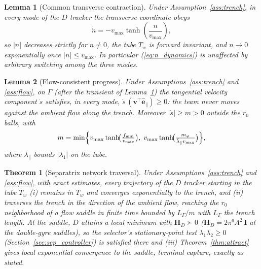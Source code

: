 \documentclass[lettersize,journal]{IEEEtran}
\newtheorem{theorem}{Theorem}
\newtheorem{lemma}{Lemma}
\begin{document}
\begin{lemma}[Common transverse contraction]
\label{lem:transverse}
Under Assumption~\ref{ass:trench}, in every mode of the $D$ tracker
the transverse coordinate obeys
\begin{equation}
    \dot{n} = -v_{\max}\tanh\!\left(\frac{n}{v_{\max}}\right),
    \label{eq:n_dynamics}
\end{equation}
so $|n|$ decreases strictly for $n \neq 0$, the tube $T_w$ is forward
invariant, and $n \to 0$ exponentially once $|n| \leq v_{\max}$. In
particular (\ref{eq:n_dynamics}) is unaffected by arbitrary switching
among the three modes.
\end{lemma}

\begin{lemma}[Flow-consistent progress]
\label{lem:progress}
Under Assumptions~\ref{ass:trench} and \ref{ass:flow}, on $\Gamma$
(after the transient of Lemma~\ref{lem:transverse}) the tangential
velocity component $\dot{s}$ satisfies, in every mode,
$\dot{s}\,(\mathbf{v}^\top \hat{\mathbf{e}}_\parallel) \geq 0$: the team
never moves against the ambient flow along the trench. Moreover
$|\dot{s}| \geq m > 0$ outside the $r_0$ balls, with
\begin{equation}
    m = \min\Bigl\{
    v_{\max}\tanh\!\bigl(\tfrac{f_{\min}}{v_{\max}}\bigr),\;
    v_{\max}\tanh\!\bigl(\tfrac{m_\varphi}
    {\bar{\lambda}_\parallel v_{\max}}\bigr)
    \Bigr\},
    \label{eq:progress_rate}
\end{equation}
where $\bar{\lambda}_\parallel$ bounds $|\lambda_1|$ on the tube.
\end{lemma}

\begin{theorem}[Separatrix network traversal]
\label{thm:separatrix}
Under Assumptions~\ref{ass:trench} and \ref{ass:flow}, with exact
estimates, every trajectory of the $D$ tracker starting in the
tube $T_w$
(i) remains in $T_w$ and converges exponentially to the trench, and (ii)
traverses the trench in the direction of the ambient flow, reaching the
$r_0$ neighborhood of a flow saddle in finite time bounded by
$L_\Gamma/m$ with $L_\Gamma$ the trench length. At the saddle, $D$
attains a local minimum with $\mathbf{H}_D \succ 0$
($\mathbf{H}_D = 2\pi^6 A^2\,\mathbf{I}$ at the double-gyre saddles), so
the selector's stationary-point test $\lambda_1\lambda_2 \geq 0$
(Section~\ref{sec:sep_controller}) is satisfied there and (iii)
Theorem~\ref{thm:attract} gives local exponential convergence to the
saddle, terminal capture, exactly as stated.
\end{theorem}
\end{document}
